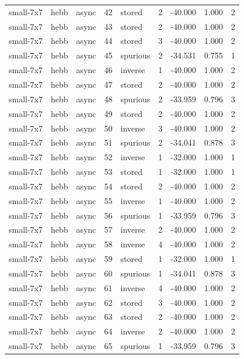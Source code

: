 \begin{tabular}{lllrlrrrr}
small-7x7 & hebb & async & 42 & stored & 2 & -40.000 & 1.000 & 2 \\
small-7x7 & hebb & async & 43 & stored & 2 & -40.000 & 1.000 & 2 \\
small-7x7 & hebb & async & 44 & stored & 3 & -40.000 & 1.000 & 2 \\
small-7x7 & hebb & async & 45 & spurious & 2 & -34.531 & 0.755 & 1 \\
small-7x7 & hebb & async & 46 & inverse & 1 & -40.000 & 1.000 & 2 \\
small-7x7 & hebb & async & 47 & stored & 2 & -40.000 & 1.000 & 2 \\
small-7x7 & hebb & async & 48 & spurious & 2 & -33.959 & 0.796 & 3 \\
small-7x7 & hebb & async & 49 & stored & 2 & -40.000 & 1.000 & 2 \\
small-7x7 & hebb & async & 50 & inverse & 3 & -40.000 & 1.000 & 2 \\
small-7x7 & hebb & async & 51 & spurious & 2 & -34.041 & 0.878 & 3 \\
small-7x7 & hebb & async & 52 & inverse & 1 & -32.000 & 1.000 & 1 \\
small-7x7 & hebb & async & 53 & stored & 1 & -32.000 & 1.000 & 1 \\
small-7x7 & hebb & async & 54 & stored & 2 & -40.000 & 1.000 & 2 \\
small-7x7 & hebb & async & 55 & inverse & 1 & -40.000 & 1.000 & 2 \\
small-7x7 & hebb & async & 56 & spurious & 1 & -33.959 & 0.796 & 3 \\
small-7x7 & hebb & async & 57 & inverse & 2 & -40.000 & 1.000 & 2 \\
small-7x7 & hebb & async & 58 & inverse & 4 & -40.000 & 1.000 & 2 \\
small-7x7 & hebb & async & 59 & stored & 1 & -32.000 & 1.000 & 1 \\
small-7x7 & hebb & async & 60 & spurious & 1 & -34.041 & 0.878 & 3 \\
small-7x7 & hebb & async & 61 & inverse & 4 & -40.000 & 1.000 & 2 \\
small-7x7 & hebb & async & 62 & stored & 3 & -40.000 & 1.000 & 2 \\
small-7x7 & hebb & async & 63 & stored & 2 & -40.000 & 1.000 & 2 \\
small-7x7 & hebb & async & 64 & inverse & 2 & -40.000 & 1.000 & 2 \\
small-7x7 & hebb & async & 65 & spurious & 1 & -33.959 & 0.796 & 3 \\

\end{tabular}
